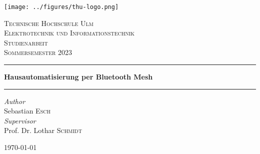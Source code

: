 \begin{titlepage} %
	\newcommand{\HRule}{\rule{\linewidth}{0.3mm}} %
	
	\center %
	
	
	\vfill
	\texttt{[image: ../figures/thu-logo.png]}\\[1cm] %
	 
	
	\vfill\vfill %
	
	
	\textsc{\LARGE Technische Hochschule Ulm}\\[1.0mm] %
	\textsc{Elektrotechnik und Informationstechnik}\\[1.5cm] %
			
	\textsc{\Large Studienarbeit}\\ %
	
	\textsc{Sommersemester 2023}\\[0.8cm] %
	
	
	\hrule
	\vspace*{0.5cm}
	
	{\huge\bfseries Hausautomatisierung per Bluetooth Mesh}\\[0.5cm] %
	
	\hrule
	\vspace*{1.5cm}
	
	
	\begin{minipage}{\textwidth}
		\begin{flushleft}
			\large
			\textit{Author}\\
			Sebastian \textsc{Esch}\\ %
            \vspace{0.5cm}
			\large
			\textit{Supervisor}\\
			Prof. Dr. Lothar \textsc{Schmidt} %
		\end{flushleft}
	\end{minipage}
	
	
	\vfill\vfill\vfill %
	
	{\large\today} %
	
	
\end{titlepage}